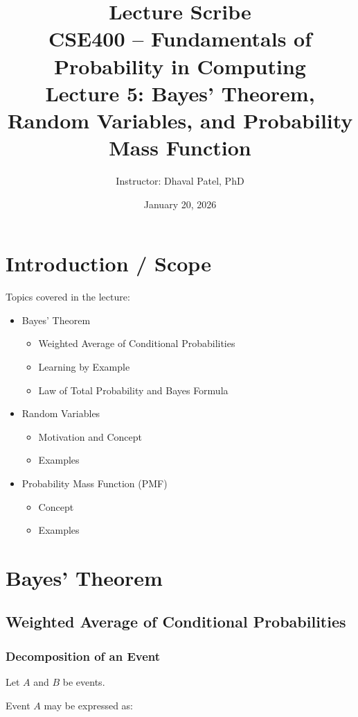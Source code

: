 \documentclass[12pt]{article}
\title{Lecture Scribe\\
\large CSE400 -- Fundamentals of Probability in Computing\\
Lecture 5: Bayes’ Theorem, Random Variables, and Probability Mass Function}
\author{Instructor: Dhaval Patel, PhD}
\date{January 20, 2026}
\begin{document}
\maketitle

\section{Introduction / Scope}

Topics covered in the lecture:

\begin{itemize}
\item Bayes’ Theorem
    \begin{itemize}
    \item Weighted Average of Conditional Probabilities
    \item Learning by Example
    \item Law of Total Probability and Bayes Formula
    \end{itemize}
\item Random Variables
    \begin{itemize}
    \item Motivation and Concept
    \item Examples
    \end{itemize}
\item Probability Mass Function (PMF)
    \begin{itemize}
    \item Concept
    \item Examples
    \end{itemize}
\end{itemize}

\section{Bayes’ Theorem}

\subsection{Weighted Average of Conditional Probabilities}

\subsubsection*{Decomposition of an Event}

Let $A$ and $B$ be events.

Event $A$ may be expressed as:
\end{document}
